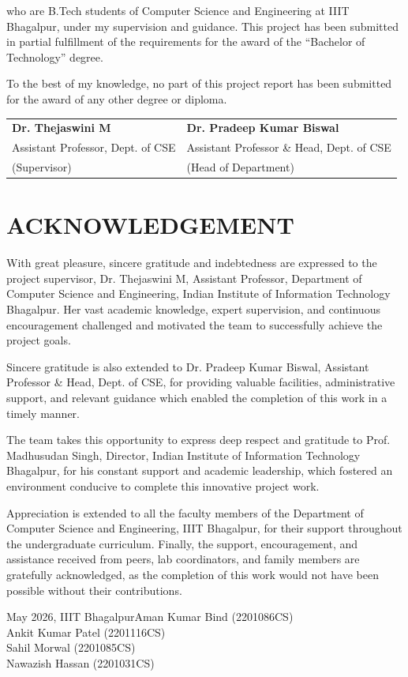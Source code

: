 \documentclass[12pt, a4paper]{report}
\newcommand{\degreeNameMixed}{Bachelor of Technology}
\newcommand{\departmentMixed}{Department of Computer Science and Engineering}
\newcommand{\instituteMixed}{Indian Institute of Information Technology Bhagalpur}
\newcommand{\instituteShort}{IIIT Bhagalpur}
\newcommand{\submissionMonthYearMixed}{May 2026}
\newcommand{\studentOneName}{Aman Kumar Bind}
\newcommand{\studentOneRoll}{2201086CS}
\newcommand{\studentTwoName}{Ankit Kumar Patel}
\newcommand{\studentTwoRoll}{2201116CS}
\newcommand{\studentThreeName}{Sahil Morwal}
\newcommand{\studentThreeRoll}{2201085CS}
\newcommand{\studentFourName}{Nawazish Hassan}
\newcommand{\studentFourRoll}{2201031CS}
\newcommand{\supervisorName}{Dr. Thejaswini M}
\newcommand{\supervisorDesignation}{Assistant Professor}
\newcommand{\hodName}{Dr. Pradeep Kumar Biswal}
\newcommand{\hodDesignation}{Assistant Professor \& Head, Dept. of CSE}
\newcommand{\directorName}{Prof. Madhusudan Singh}
\begin{document}
who are B.Tech students of Computer Science and Engineering at \instituteShort, under my supervision and guidance. This project has been submitted in partial fulfillment of the requirements for the award of the ``\degreeNameMixed'' degree.

To the best of my knowledge, no part of this project report has been submitted for the award of any other degree or diploma.

\vspace{2cm}

\noindent
\begin{tabular}{p{7cm}p{7cm}}
\textbf{\supervisorName} & \textbf{\hodName}\\
\supervisorDesignation, Dept. of CSE &
\hodDesignation\\
(Supervisor) & (Head of Department)
\end{tabular}

\chapter*{ACKNOWLEDGEMENT}
With great pleasure, sincere gratitude and indebtedness are expressed to the project supervisor, \supervisorName, \supervisorDesignation, \departmentMixed, \instituteMixed. Her vast academic knowledge, expert supervision, and continuous encouragement challenged and motivated the team to successfully achieve the project goals. 

Sincere gratitude is also extended to \hodName, \hodDesignation, for providing valuable facilities, administrative support, and relevant guidance which enabled the completion of this work in a timely manner.

The team takes this opportunity to express deep respect and gratitude to \directorName, Director, \instituteMixed, for his constant support and academic leadership, which fostered an environment conducive to complete this innovative project work.

Appreciation is extended to all the faculty members of the \departmentMixed, \instituteShort, for their support throughout the undergraduate curriculum. Finally, the support, encouragement, and assistance received from peers, lab coordinators, and family members are gratefully acknowledged, as the completion of this work would not have been possible without their contributions.

\vspace{1cm}
\noindent \submissionMonthYearMixed, \instituteShort \hfill \studentOneName{} (\studentOneRoll)\\
\null \hfill \studentTwoName{} (\studentTwoRoll)\\
\null \hfill \studentThreeName{} (\studentThreeRoll)\\
\null \hfill \studentFourName{} (\studentFourRoll)
\end{document}
